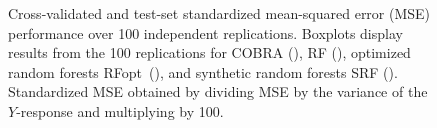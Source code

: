 \documentclass{bmcart}
\def\RFopt{RFopt}
\newcommand{\black}{\textcolor{black}}
\newcommand{\red}{\textcolor{red}}
\newcommand{\blue}{\textcolor{blue}}
\newcommand{\gray}{\textcolor{gray}}
\begin{document}
\begin{backmatter}





  \begin{figure}[ht]
  \caption{  Cross-validated
    and test-set standardized mean-squared error (MSE) performance
    over 100 independent replications.   Boxplots display results
    from the 100 replications for COBRA
    (\gray{\blacksquare}), RF (\red{\blacksquare}), optimized random
    forests \RFopt\, (\blue{\blacksquare}), and synthetic random forests
    SRF (\black{\blacksquare}).  Standardized MSE obtained by
    dividing MSE by the variance of the $Y$-response and multiplying by
    100.}
  \begin{center}
  \end{center}
  \end{figure}


\end{backmatter}
\end{document}
